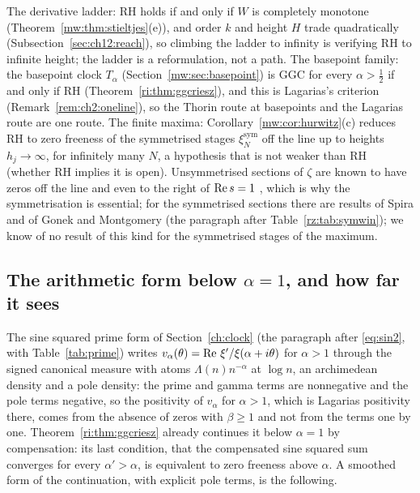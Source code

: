 The derivative ladder: RH holds if and only if $W$ is completely monotone (Theorem~\ref{mw:thm:stieltjes}(e)), and order $k$ and height $H$ trade quadratically (Subsection~\ref{sec:ch12:reach}), so climbing the ladder to infinity is verifying RH to infinite height; the ladder is a reformulation, not a path. The basepoint family: the basepoint clock $T_\alpha$ (Section~\ref{mw:sec:basepoint}) is GGC for every $\alpha>\tfrac12$ if and only if RH (Theorem~\ref{ri:thm:ggcriesz}), and this is Lagarias's criterion \cite{Lagarias} (Remark~\ref{rem:ch2:oneline}), so the Thorin route at basepoints and the Lagarias route are one route. The finite maxima: Corollary~\ref{mw:cor:hurwitz}(c) reduces RH to zero freeness of the symmetrised stages $\xi_N^{\mathrm{sym}}$ off the line up to heights $h_j\to\infty$, for infinitely many $N$, a hypothesis that is not weaker than RH (whether RH implies it is open). Unsymmetrised sections of $\zeta$ are known to have zeros off the line and even to the right of $\operatorname{Re} s=1$ \cite{Turan48,Montgomery83}, which is why the symmetrisation is essential; for the symmetrised sections there are results of Spira and of Gonek and Montgomery \cite{Spira67,GonekMontgomery13} (the paragraph after Table~\ref{rz:tab:symwin}); we know of no result of this kind for the symmetrised stages of the maximum.

\subsection{The arithmetic form below \texorpdfstring{$\alpha=1$}{alpha = 1}, and how far it sees}

The sine squared prime form of Section~\ref{ch:clock} (the paragraph after \eqref{eq:sin2}, with Table~\ref{tab:prime}) writes $v_\alpha(\theta)=\operatorname{Re}\,\xi'/\xi(\alpha+i\theta)$ for $\alpha>1$ through the signed canonical measure with atoms $\Lambda(n)n^{-\alpha}$ at $\log n$, an archimedean density and a pole density: the prime and gamma terms are nonnegative and the pole terms negative, so the positivity of $v_\alpha$ for $\alpha>1$, which is Lagarias positivity there, comes from the absence of zeros with $\beta\ge1$ and not from the terms one by one. Theorem~\ref{ri:thm:ggcriesz} already continues it below $\alpha=1$ by compensation: its last condition, that the compensated sine squared sum converges for every $\alpha'>\alpha$, is equivalent to zero freeness above $\alpha$. A smoothed form of the continuation, with explicit pole terms, is the following.

